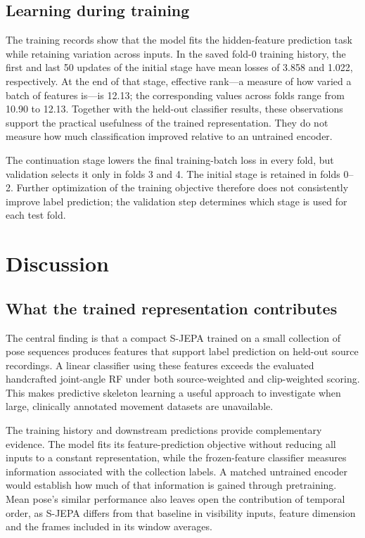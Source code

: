 \documentclass[10pt,twocolumn,letterpaper]{article}
\begin{document}
\subsection{Learning during training}
The training records show that the model fits the hidden-feature prediction task while retaining variation across inputs. In the saved fold-0 training history, the first and last 50 updates of the initial stage have mean losses of 3.858 and 1.022, respectively. At the end of that stage, effective rank---a measure of how varied a batch of features is---is 12.13; the corresponding values across folds range from 10.90 to 12.13. Together with the held-out classifier results, these observations support the practical usefulness of the trained representation. They do not measure how much classification improved relative to an untrained encoder.

The continuation stage lowers the final training-batch loss in every fold, but validation selects it only in folds 3 and 4. The initial stage is retained in folds 0--2. Further optimization of the training objective therefore does not consistently improve label prediction; the validation step determines which stage is used for each test fold.




\section{Discussion}
\subsection{What the trained representation contributes}
The central finding is that a compact S-JEPA trained on a small collection of pose sequences produces features that support label prediction on held-out source recordings. A linear classifier using these features exceeds the evaluated handcrafted joint-angle RF under both source-weighted and clip-weighted scoring. This makes predictive skeleton learning a useful approach to investigate when large, clinically annotated movement datasets are unavailable.

The training history and downstream predictions provide complementary evidence. The model fits its feature-prediction objective without reducing all inputs to a constant representation, while the frozen-feature classifier measures information associated with the collection labels. A matched untrained encoder would establish how much of that information is gained through pretraining. Mean pose's similar performance also leaves open the contribution of temporal order, as S-JEPA differs from that baseline in visibility inputs, feature dimension and the frames included in its window averages.
\end{document}
